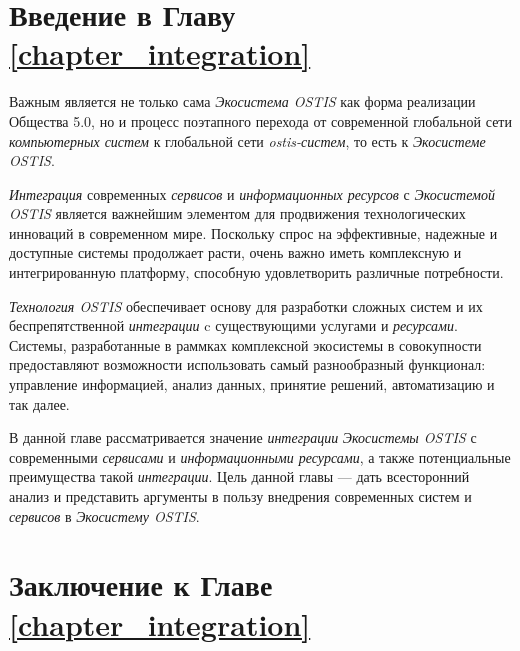 \section*{Введение в Главу \ref{chapter_integration}}
Важным является не только сама \textit{Экосистема OSTIS} как форма реализации Общества 5.0, но и процесс поэтапного перехода от современной глобальной сети \textit{компьютерных систем} к глобальной сети \textit{ostis-систем}, то есть к \textit{Экосистеме OSTIS}.

\textit{Интеграция} современных \textit{сервисов} и \textit{информационных ресурсов} с \textit{Экосистемой OSTIS} является важнейшим элементом для продвижения технологических инноваций в современном мире. Поскольку спрос на эффективные, надежные и доступные системы продолжает расти, очень важно иметь комплексную и интегрированную платформу, способную удовлетворить различные потребности.

\textit{Технология OSTIS} обеспечивает основу для разработки сложных систем и их беспрепятственной \textit{интеграции} c существующими услугами и \textit{ресурсами}. Системы, разработанные в раммках комплексной экосистемы в совокупности предоставляют возможности использовать самый разнообразный функционал: управление информацией, анализ данных, принятие решений, автоматизацию и так далее.

В данной главе рассматривается значение \textit{интеграции} \textit{Экосистемы OSTIS} с современными \textit{сервисами} и \textit{информационными ресурсами}, а также потенциальные преимущества такой \textit{интеграции}. 
Цель данной главы --- дать всесторонний анализ и представить аргументы в пользу внедрения современных систем и \textit{сервисов} в \textit{Экосистему OSTIS}.




%
\section*{Заключение к Главе \ref{chapter_integration}}

